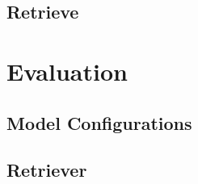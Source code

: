 \subsection{Retrieve}

\section{Evaluation}
\label{ref:appendixA-evaluation}

\subsection{Model Configurations}
\label{ref:appendixA-evaluation-model-configurations}


\subsection{Retriever}
\label{ref:appendixA-evaluation-retriever}


